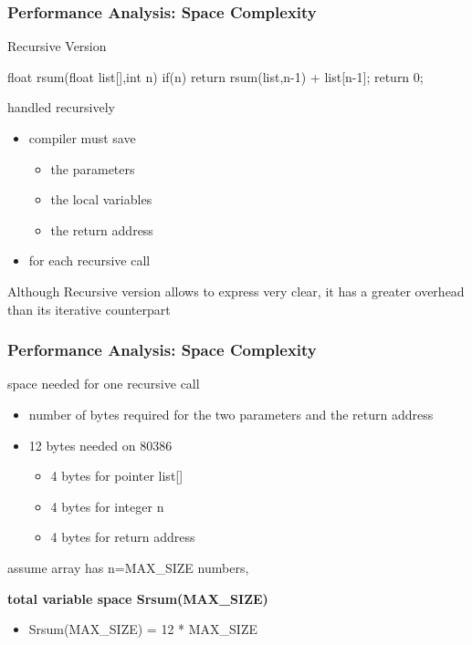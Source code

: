 \documentclass[newPxFont,sthlmFooter,nooffset]{beamer}
\begin{document}
\begin{frame}[t, fragile]
  \frametitle{Performance Analysis: Space Complexity}
Recursive Version
\begin{codedef}
float rsum(float list[],int n) {
   if(n) return rsum(list,n-1) + list[n-1]; 
   return 0;
}
\end{codedef}
handled recursively
\begin{itemize}
\item compiler must save
  \begin{itemize}
  \item the parameters
  \item the local variables
  \item the return address
  \end{itemize}
\item for each recursive call
\end{itemize}
Although Recursive version allows to express very clear, it has a greater overhead than its iterative counterpart
\end{frame}

\begin{frame}[t]
  \frametitle{Performance Analysis: Space Complexity}
space needed for one recursive call
\begin{itemize}
\item number of bytes required for the two parameters and the return
  address
\item 12 bytes needed on 80386
  \begin{itemize}
  \item 4 bytes for pointer list[]
  \item 4 bytes for integer n
  \item 4 bytes for return address
  \end{itemize}

\end{itemize}

\textsf{assume} array has n=MAX\_SIZE numbers, 

\textbf{total variable space Srsum(MAX\_SIZE)}
\begin{itemize}
\item Srsum(MAX\_SIZE) = 12 * MAX\_SIZE
\end{itemize}

\end{frame}
\end{document}
